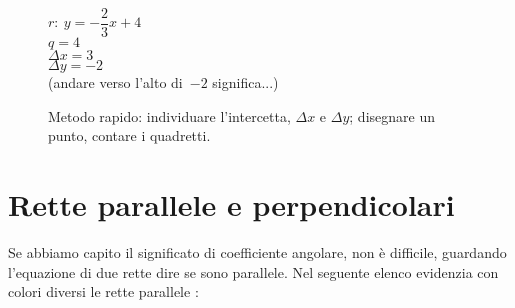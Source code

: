 \begin{inaccessibleblock}
 \begin{figure}[h]
\centering \hspace{-5mm}
 \begin{minipage}[]{.40\textwidth}
  \begin{center}
   \(r:~y = - \dfrac{2}{3}x + 4\)\\[.5em]

   \(q = 4\)\\[.5em]

   \(\Delta x = 3\)\\[.5em]

   \(\Delta y = -2\)\\[.5em]
   
   (andare verso l'alto di~\(-2\) significa...)
  \end{center}
 \end{minipage}
 \begin{minipage}[]{.60\textwidth}
   \centering \metodorapido %
 \end{minipage}
  \caption{Metodo rapido: individuare l'intercetta, 
\(\Delta x\) e \(\Delta y\); disegnare un punto, contare i quadretti.} 
\label{fig:metodorapido}
\end{figure}
\end{inaccessibleblock}


\section{Rette parallele e perpendicolari}
\label{sec:retta_paralleleleperpendicolari}

Se abbiamo capito il significato di coefficiente angolare, non è difficile, 
guardando l'equazione di due rette dire se sono parallele. Nel seguente 
elenco evidenzia con colori diversi le rette parallele :

